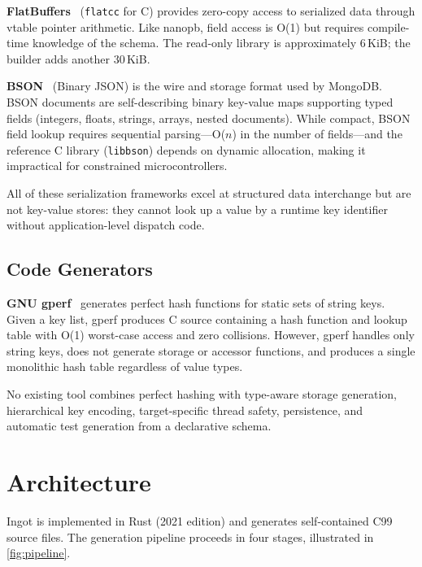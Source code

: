\documentclass[10pt,twocolumn,letterpaper]{article}
\begin{document}
\textbf{FlatBuffers}~\cite{flatbuffers} (\texttt{flatcc} for C)
provides zero-copy access to serialized data through vtable pointer
arithmetic.  Like nanopb, field access is O(1) but requires
compile-time knowledge of the schema.  The read-only library is
approximately 6\,KiB; the builder adds another 30\,KiB.

\textbf{BSON}~\cite{bson} (Binary JSON) is the wire and storage
format used by MongoDB.  BSON documents are self-describing
binary key-value maps supporting typed fields (integers, floats,
strings, arrays, nested documents).  While compact, BSON field
lookup requires sequential parsing---O($n$) in the number of
fields---and the reference C library (\texttt{libbson}) depends on
dynamic allocation, making it impractical for constrained
microcontrollers.

All of these serialization frameworks excel at structured data
interchange but are not key-value stores: they cannot look up a value
by a runtime key identifier without application-level dispatch code.

\subsection{Code Generators}

\textbf{GNU gperf}~\cite{gperf} generates perfect hash functions for
static sets of string keys.  Given a key list, gperf produces C
source containing a hash function and lookup table with O(1)
worst-case access and zero collisions.  However, gperf handles only
string keys, does not generate storage or accessor functions, and
produces a single monolithic hash table regardless of value types.

No existing tool combines perfect hashing with type-aware storage
generation, hierarchical key encoding, target-specific thread safety,
persistence, and automatic test generation from a declarative schema.

\section{Architecture}
\label{sec:architecture}

Ingot is implemented in Rust (2021 edition) and generates
self-contained C99 source files.  The generation pipeline proceeds in
four stages, illustrated in \cref{fig:pipeline}.
\end{document}
